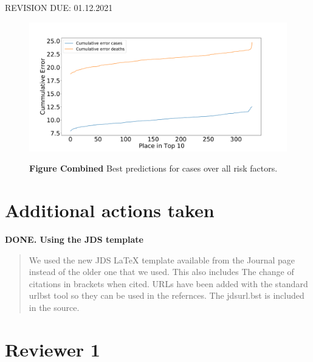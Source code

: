 


\newcommand{\REVIEW}[3]{
  \begin{tcolorbox}[colback={#1}]
    {\bf {#1}. {#2}}
 \end{tcolorbox}
  \begin{quote}
    {#3}
  \end{quote}
}

REVISION DUE: 01.12.2021



\begin{figure}[!h]
        \centering
        \includegraphics[width=1.0\textwidth]{images/predict/PlaceTop10_CasesAndDeath.pdf}
        
        {\bf Figure Combined} Best predictions for cases over all risk factors.
        

\end{figure}

\section{Additional actions taken}


\REVIEW{DONE}{Using the JDS template} {We used the new JDS \LaTeX
  template available from the Journal page instead of the older one
  that we used. This also includes The change of citations in brackets
  when cited. URLs have been added with the standard urlbst tool so
  they can be used in the refernces. The jdsurl.bst is included in the
  source.}



\section*{Reviewer 1}

